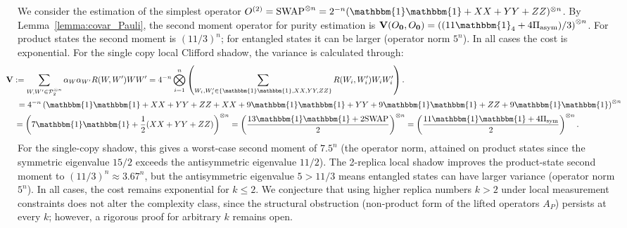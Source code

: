 \documentclass[aps,%
twocolumn,%
floatfix,%
pra,%
amsfonts,%
groupedaddress,%
superscriptaddress]{revtex4-2}%
\newcommand{\1}{\mathbbm{1}}
\begin{document}
We consider the estimation of the simplest operator $O^{(2)} = \text{SWAP}^{\otimes n} = 2^{-n}(\1\1+XX+YY+ZZ)^{\otimes n}$.
By Lemma~\ref{lemma:covar_Pauli}, the second moment operator for purity estimation is $\mathbf{V}(O_\mathbf{0},O_\mathbf{0}) = \left({(11\1_4 + 4\Pi_{\mathrm{asym}})}/{3}\right)^{\otimes n}$. For product states the second moment is $(11/3)^n$; for entangled states it can be larger (operator norm $5^n$). In all cases the cost is exponential.
For the single copy local Clifford shadow, the variance is calculated through:
\begin{align}
    &\hspace{-1.5cm}\mathbf{V}:= \sum_{W,W' \in \mathcal{P}_2^{\otimes n}} \alpha_{W}\alpha_{W'} R(W,W') W W'= 4^{-n}\bigotimes_{i =1}^n \left(\sum_{W_i,W_i' \in \{\1\1,XX,YY,ZZ\}} R(W_i,W'_i) W_i W_i'\right).\notag\\
   = 4^{-n} &\left( \1\1+XX+YY+ZZ+ XX+9\1\1 + YY + 9\1\1 +ZZ+ 9\1\1\right)^{\otimes n}\notag\\
  & \hspace{-1.15cm}= \left(7 \1\1 + \frac{1}{2}(XX+YY+ZZ)\right)^{\otimes n}= \left(\frac{13\1\1+2\text{SWAP}}{2}\right)^{\otimes n} = \left(\frac{11\1\1+ 4\Pi_{\mathrm{sym}}}{2}\right)^{\otimes n}. \label{eq:prity_1rep_shadow_variance}
\end{align}
For the single-copy shadow, this gives a worst-case second moment of $7.5^n$ (the operator norm, attained on product states since the symmetric eigenvalue $15/2$ exceeds the antisymmetric eigenvalue $11/2$). The 2-replica local shadow improves the product-state second moment to $(11/3)^n \approx 3.67^n$, but the antisymmetric eigenvalue $5 > 11/3$ means entangled states can have larger variance (operator norm $5^n$). In all cases, the cost remains exponential for $k \leq 2$. \color{red}We conjecture that using higher replica numbers $k > 2$ under local measurement constraints does not alter the complexity class, since the structural obstruction (non-product form of the lifted operators $A_P$) persists at every $k$; however, a rigorous proof for arbitrary $k$ remains open.\color{black}
\end{document}
